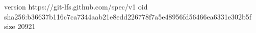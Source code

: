 version https://git-lfs.github.com/spec/v1
oid sha256:b36637b116c7ca7344aab21e8edd226778f7a5e48956fd56466ea6331e302b5f
size 20921
